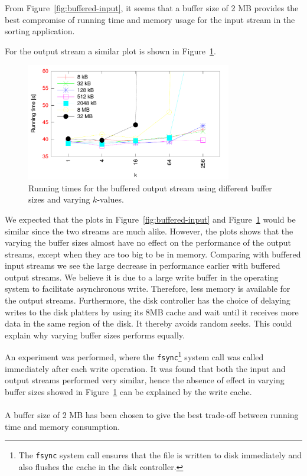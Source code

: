 \documentclass[a4paper,12pt]{article}
\begin{document}
From Figure~\ref{fig:buffered-input}, it seems that a buffer size of 2
MB provides the best compromise of running time and memory usage for
the input stream in the sorting application.

For the output stream a similar plot is shown in
Figure~\ref{fig:buffered-output}.

\begin{figure}[h!]
  \centering
  \includegraphics[width=0.8\textwidth]{buffered_output}
  \caption{Running times for the buffered output stream using different
    buffer sizes and varying $k$-values.}
  \label{fig:buffered-output}
\end{figure}

We expected that the plots in Figure~\ref{fig:buffered-input} and
Figure~\ref{fig:buffered-output} would be similar since the two streams
are much alike. However, the plots shows that the varying the buffer sizes
almost have no effect on the performance of the output streams, except
when they are too big to be in memory. Comparing with buffered input streams we see the large decrease in performance earlier with buffered output streams. We believe it is due to a large write buffer in the operating system to facilitate asynchronous write. Therefore, less memory is available for the output streams.
Furthermore, the disk controller has the choice of delaying writes to the disk platters by using its 8MB cache and wait until it receives more data in the same region of the disk. It thereby avoids random seeks. This could explain why varying buffer sizes performs equally.

An experiment was performed, where the
\texttt{fsync}\footnote{The \texttt{fsync} system call ensures
  that the file is written to disk immediately and also flushes the cache in the disk controller.} system call was
called immediately after each write operation. It was found that both
the input and output streams performed very similar, hence the absence
of effect in varying buffer sizes showed in
Figure~\ref{fig:buffered-output} can be explained by the write cache.
\\
\\
A buffer size of 2 MB has been chosen to give the best trade-off
between running time and memory consumption.
\end{document}
